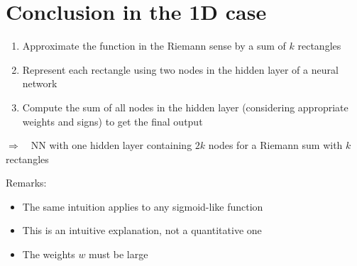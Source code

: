 \documentclass[10pt]{article}
\begin{document}
\section*{Conclusion in the 1D case}
\begin{enumerate}
  \item Approximate the function in the Riemann sense by a sum of $k$ rectangles

  \item Represent each rectangle using two nodes in the hidden layer of a neural network

  \item Compute the sum of all nodes in the hidden layer (considering appropriate weights and signs) to get the final output

\end{enumerate}

$\Rightarrow \quad \mathrm{NN}$ with one hidden layer containing $2 k$ nodes for a Riemann sum with $k$ rectangles

Remarks:

\begin{itemize}
  \item The same intuition applies to any sigmoid-like function
  \item This is an intuitive explanation, not a quantitative one
  \item The weights $w$ must be large
\end{itemize}
\end{document}
